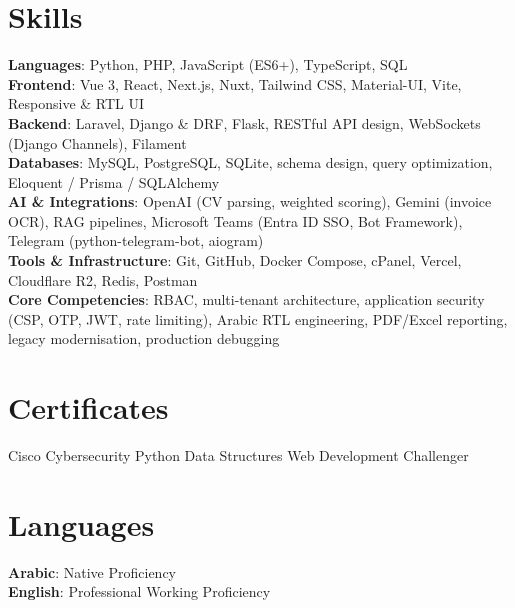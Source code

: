 \documentclass[letterpaper,11pt]{article}
\begin{document}
\section{Skills}
 \begin{itemize}[leftmargin=0.15in, label={}]
    \small{\item{
     \textbf{Languages}{: Python, PHP, JavaScript (ES6+), TypeScript, SQL} \\
     \textbf{Frontend}{: Vue 3, React, Next.js, Nuxt, Tailwind CSS, Material-UI, Vite, Responsive \& RTL UI} \\
     \textbf{Backend}{: Laravel, Django \& DRF, Flask, RESTful API design, WebSockets (Django Channels), Filament} \\
     \textbf{Databases}{: MySQL, PostgreSQL, SQLite, schema design, query optimization, Eloquent / Prisma / SQLAlchemy} \\
     \textbf{AI \& Integrations}{: OpenAI (CV parsing, weighted scoring), Gemini (invoice OCR), RAG pipelines, Microsoft Teams (Entra ID SSO, Bot Framework), Telegram (python-telegram-bot, aiogram)} \\
     \textbf{Tools \& Infrastructure}{: Git, GitHub, Docker Compose, cPanel, Vercel, Cloudflare R2, Redis, Postman} \\
     \textbf{Core Competencies}{: RBAC, multi-tenant architecture, application security (CSP, OTP, JWT, rate limiting), Arabic RTL engineering, PDF/Excel reporting, legacy modernisation, production debugging} \\
    }}
 \end{itemize}
 \vspace{-16pt}

\section{Certificates}
 \begin{itemize}[leftmargin=0.15in, label={}]
    \small{\item{
     Cisco Cybersecurity \textbullet{} Python Data Structures \textbullet{} Web Development Challenger \\
    }}
 \end{itemize}
 \vspace{-16pt}

\section{Languages}
 \begin{itemize}[leftmargin=0.15in, label={}]
    \small{\item{
     \textbf{Arabic}{: Native Proficiency} \\
     \textbf{English}{: Professional Working Proficiency} \\
    }}
 \end{itemize}
\end{document}
